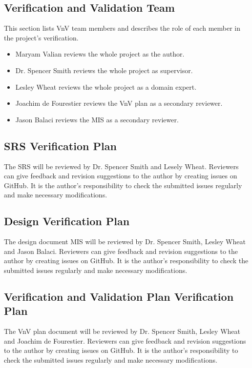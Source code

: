 \documentclass[12pt, titlepage]{article}
\begin{document}
\subsection{Verification and Validation Team} \label{VTeam}
This section lists VnV team members and describes the role of each member in the project's verification.
\begin{itemize}
\item {Maryam Valian reviews the whole project as the author.}
\item {Dr. Spencer Smith reviews the whole project as supervisor.}
\item{Lesley Wheat reviews the whole project as a domain expert.}
\item{Joachim de Fourestier reviews the VnV plan as a secondary reviewer.}
\item{Jason Balaci reviews the MIS as a secondary reviewer.}

\end{itemize}

\subsection{SRS Verification Plan} \label{SRSvplan}
The SRS will be reviewed by Dr. Spencer Smith and Lesely Wheat. Reviewers can give feedback and revision suggestions to the author by creating issues on GitHub. It is the author's responsibility to check the submitted issues regularly and make necessary modifications.

\subsection{Design Verification Plan} \label{Sec_Design_verific}

The design document MIS will be reviewed by Dr. Spencer Smith, Lesley Wheat and Jason Balaci. Reviewers can give feedback and revision suggestions to the author by creating issues on GitHub. It is the author's responsibility to check the submitted issues regularly and make necessary modifications.

\subsection{Verification and Validation Plan Verification Plan} \label{Sec_VofVnV}
The VnV plan document will be reviewed by Dr. Spencer Smith, Lesley Wheat and Joachim de Fourestier. Reviewers can give feedback and revision suggestions to the author by creating issues on GitHub. It is the author's responsibility to check the submitted issues regularly and make necessary modifications.
\end{document}
